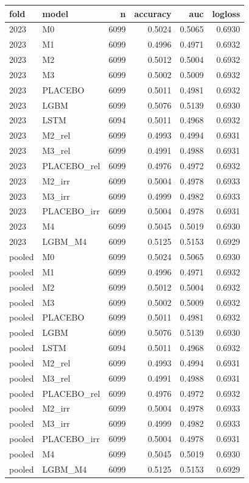 \begin{tabular}{llrrrr}
\toprule
fold & model & n & accuracy & auc & logloss \\
\midrule
2023 & M0 & 6099 & 0.5024 & 0.5065 & 0.6930 \\
2023 & M1 & 6099 & 0.4996 & 0.4971 & 0.6932 \\
2023 & M2 & 6099 & 0.5012 & 0.5004 & 0.6932 \\
2023 & M3 & 6099 & 0.5002 & 0.5009 & 0.6932 \\
2023 & PLACEBO & 6099 & 0.5011 & 0.4981 & 0.6932 \\
2023 & LGBM & 6099 & 0.5076 & 0.5139 & 0.6930 \\
2023 & LSTM & 6094 & 0.5011 & 0.4968 & 0.6932 \\
2023 & M2\_rel & 6099 & 0.4993 & 0.4994 & 0.6931 \\
2023 & M3\_rel & 6099 & 0.4991 & 0.4988 & 0.6931 \\
2023 & PLACEBO\_rel & 6099 & 0.4976 & 0.4972 & 0.6932 \\
2023 & M2\_irr & 6099 & 0.5004 & 0.4978 & 0.6933 \\
2023 & M3\_irr & 6099 & 0.4999 & 0.4982 & 0.6933 \\
2023 & PLACEBO\_irr & 6099 & 0.5004 & 0.4978 & 0.6931 \\
2023 & M4 & 6099 & 0.5045 & 0.5019 & 0.6930 \\
2023 & LGBM\_M4 & 6099 & 0.5125 & 0.5153 & 0.6929 \\
pooled & M0 & 6099 & 0.5024 & 0.5065 & 0.6930 \\
pooled & M1 & 6099 & 0.4996 & 0.4971 & 0.6932 \\
pooled & M2 & 6099 & 0.5012 & 0.5004 & 0.6932 \\
pooled & M3 & 6099 & 0.5002 & 0.5009 & 0.6932 \\
pooled & PLACEBO & 6099 & 0.5011 & 0.4981 & 0.6932 \\
pooled & LGBM & 6099 & 0.5076 & 0.5139 & 0.6930 \\
pooled & LSTM & 6094 & 0.5011 & 0.4968 & 0.6932 \\
pooled & M2\_rel & 6099 & 0.4993 & 0.4994 & 0.6931 \\
pooled & M3\_rel & 6099 & 0.4991 & 0.4988 & 0.6931 \\
pooled & PLACEBO\_rel & 6099 & 0.4976 & 0.4972 & 0.6932 \\
pooled & M2\_irr & 6099 & 0.5004 & 0.4978 & 0.6933 \\
pooled & M3\_irr & 6099 & 0.4999 & 0.4982 & 0.6933 \\
pooled & PLACEBO\_irr & 6099 & 0.5004 & 0.4978 & 0.6931 \\
pooled & M4 & 6099 & 0.5045 & 0.5019 & 0.6930 \\
pooled & LGBM\_M4 & 6099 & 0.5125 & 0.5153 & 0.6929 \\
\bottomrule
\end{tabular}
